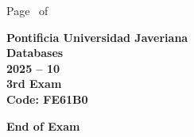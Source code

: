 \documentclass[11pt, addpoints]{exam}\usepackage[utf8]{inputenc}
\begin{document}
\begin{coverpages}
\begin{center}
			\vspace{3mm}
			\leavevmode \hspace{5mm} 
		\end{center}
	\end{coverpages}

	\footer{} {Page \thepage\ of \numpages} {}

	\centering
	\textbf{\Large Pontificia Universidad Javeriana}\\
	\textbf{\Large Databases} \\
	\textbf{\large 2025 -- 10} \\
	\textbf{\large 3rd Exam} \\
	\textbf{Code: FE61B0}


	\begin{questions}
		
		
		
		
		
		
		
		
		
		
		
		
		
		
		
		
		
		
		
		
	\end{questions}

	\vspace{5mm}
	\noindent \textbf{End of Exam}
\end{document}
